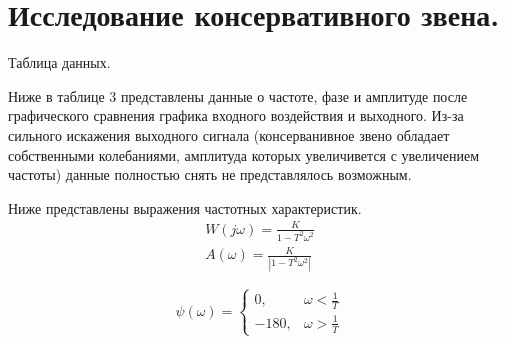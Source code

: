\documentclass[a4paper, 11pt]{article}
\begin{document}
\section*{Исследование консервативного звена.}

\begin{minipage}[t]{0.6\textwidth}
    \vspace{-0.7cm}
    \begin{table}[H]
        \centering
        \caption{Таблица данных.}
    \end{table}
\end{minipage}
\begin{minipage}[t]{0.4\textwidth}
Ниже в таблице 3 представлены данные о частоте, фазе и амплитуде после графического сравнения графика входного воздействия и выходного. Из-за сильного искажения выходного сигнала (консерванивное звено обладает собственными колебаниями, амплитуда которых увеличивется с увеличением частоты) данные полностью снять не представлялось возможным. \par
Ниже представлены выражения частотных характеристик.
    \begin{align}
        W(j\omega) = \frac{K}{1 - T^2\omega^2} \\
        A(\omega) = \frac{K}{|1 - T^2\omega^2|}
    \end{align}
\end{minipage}
\newpage
\begin{equation}
    \psi(\omega) = \begin{cases}
        0, & \omega < \frac{1}{T} \\
        -180, & \omega > \frac{1}{T}
    \end{cases}
\end{equation}
\end{document}

